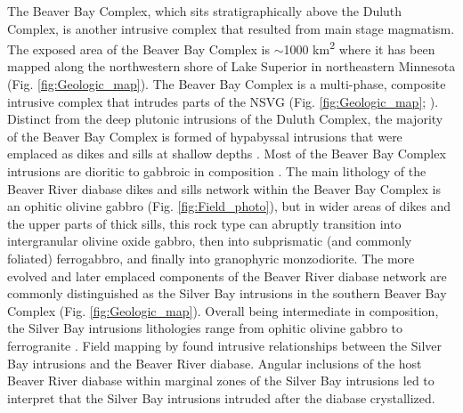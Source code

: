 \documentclass[draft]{agujournal2019}
\begin{document}
The Beaver Bay Complex, which sits stratigraphically above the Duluth Complex, is another intrusive complex that resulted from main stage magmatism. The exposed area of the Beaver Bay Complex is $\sim$1000 km\textsuperscript{2} where it has been mapped along the northwestern shore of Lake Superior in northeastern Minnesota (Fig. \ref{fig:Geologic_map}). The Beaver Bay Complex is a multi-phase, composite intrusive complex that intrudes parts of the NSVG (Fig. \ref{fig:Geologic_map}; ). Distinct from the deep plutonic intrusions of the Duluth Complex, the majority of the Beaver Bay Complex is formed of hypabyssal intrusions that were emplaced as dikes and sills at shallow depths \cite{Miller1997a}. Most of the Beaver Bay Complex intrusions are dioritic to gabbroic in composition \cite{Miller1997a}. The main lithology of the Beaver River diabase dikes and sills network within the Beaver Bay Complex is an ophitic olivine gabbro (Fig. \ref{fig:Field_photo}), but in wider areas of dikes and the upper parts of thick sills, this rock type can abruptly transition into intergranular olivine oxide gabbro, then into subprismatic (and commonly foliated) ferrogabbro, and finally into granophyric monzodiorite. The more evolved and later emplaced components of the Beaver River diabase network are commonly distinguished as the Silver Bay intrusions in the southern Beaver Bay Complex (Fig. \ref{fig:Geologic_map}). Overall being intermediate in composition, the Silver Bay intrusions lithologies range from ophitic olivine gabbro to ferrogranite \cite{Shank1989a}. Field mapping by  found intrusive relationships between the Silver Bay intrusions and the Beaver River diabase. Angular inclusions of the host Beaver River diabase within marginal zones of the Silver Bay intrusions led  to interpret that the Silver Bay intrusions intruded after the diabase crystallized.
\end{document}
